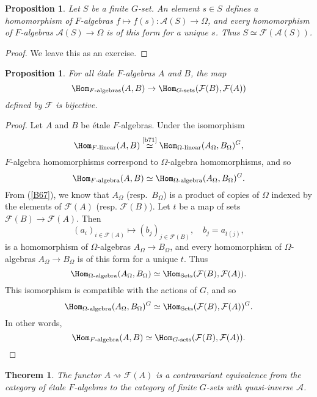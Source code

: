 \documentclass[a4paper,11pt,final,openany]{memoir}
\newtheorem{proposition}[X]{Proposition}
\newtheorem{theorem}[X]{Theorem}
\theoremstyle{nonumberplain}
\newtheorem{proof}{Proof.}
\begin{document}
\begin{proposition}
\label{b79}Let $S$ be a finite $G$-set. An element $s\in S$ defines a
homomorphism of $F$-algebras $f\mapsto f(s)\colon\mathcal{A}{}(S)\rightarrow
\Omega$, and every homomorphism of $F$-algebras $\mathcal{A}{}(S)\rightarrow
\Omega$ is of this form for a unique $s$. Thus $S\simeq\mathcal{F}%
{}(\mathcal{A}{}(S))$.
\end{proposition}

\begin{proof}
We leave this as an exercise.
\end{proof}

\begin{proposition}
\label{b81}For all \'{e}tale $F$-algebras $A$ and $B$, the map%
\[
\Hom_{F\text{-algebras}}(A,B)\rightarrow\Hom_{G\text{-sets}}(\mathcal{F}%
{}(B),\mathcal{F}{}(A))
\]
defined by $\mathcal{F}{}$ is bijective.
\end{proposition}

\begin{proof}
Let $A$ and $B$ be \'{e}tale $F$-algebras. Under the isomorphism%
\[
\Hom_{F\text{-linear}}(A,B)\overset{\text{\ref{b71}}}{\simeq}\Hom_{\Omega
\text{-linear}}(A_{\Omega},B_{\Omega})^{G},
\]
$F$-algebra homomorphisms correspond to $\Omega$-algebra homomorphisms, and so%
\[
\Hom_{F\text{-algebra}}(A,B)\simeq\Hom_{\Omega\text{-algebra}}(A_{\Omega
},B_{\Omega})^{G}\text{.}%
\]
From (\ref{B67}), we know that $A_{\Omega}$ (resp.\ $B_{\Omega}$) is a product
of copies of $\Omega$ indexed by the elements of $\mathcal{F}{}(A)$ (resp.
$\mathcal{F}{}(B)$). Let $t$ be a map of sets $\mathcal{F}{}(B)\rightarrow
\mathcal{F}{}(A)$. Then
\[
(a_{i})_{i\in\mathcal{F}{}(A)}\mapsto(b_{j})_{j\in\mathcal{F}{}(B)},\quad
b_{j}=a_{t(j)},
\]
is a homomorphism of $\Omega$-algebras $A_{\Omega}\rightarrow B_{\Omega}$, and
every homomorphism of $\Omega$-algebras $A_{\Omega}\rightarrow B_{\Omega}$ is
of this form for a unique $t$. Thus%
\[
\Hom_{\Omega\text{-algebra}}(A_{\Omega},B_{\Omega})\simeq\Hom_{\text{Sets}%
}(\mathcal{F}(B),\mathcal{F}{}(A)).
\]
This isomorphism is compatible with the actions of $G$, and so%
\[
\Hom_{\Omega\text{-algebra}}(A_{\Omega},B_{\Omega})^{G}\simeq\Hom_{\text{Sets}%
}(\mathcal{F}(B),\mathcal{F}{}(A))^{G}.
\]
In other words,%
\[
\Hom_{F\text{-algebra}}(A,B)\simeq\Hom_{G\text{-sets}}(\mathcal{F}%
{}(B),\mathcal{F}{}(A)).
\]

\end{proof}

\begin{theorem}
\label{B71}The functor $A\rightsquigarrow\mathcal{F}{}(A)$ is a contravariant
equivalence from the category of \'{e}tale $F$-algebras to the category of
finite $G$-sets with quasi-inverse $\mathcal{A}{}$.
\end{theorem}
\end{document}
